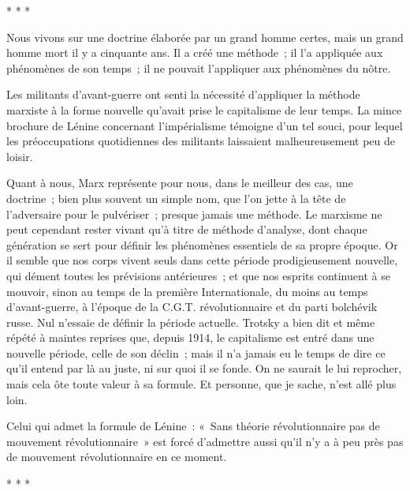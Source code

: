 \documentclass[french,twoside]{book} %
\begin{document}
\begin{center}
\noindent \centerline{* * *}\par
\end{center}

\noindent Nous vivons sur une doctrine élaborée par un grand homme certes, mais un grand homme mort il y a cinquante ans. Il a créé une méthode ; il l'a appliquée aux phénomènes de son temps ; il ne pouvait l'appliquer aux phénomènes du nôtre.\par
Les militants d'avant-guerre ont senti la nécessité d'appliquer la méthode marxiste à la forme nouvelle qu'avait prise le capitalisme de leur temps. La mince brochure de Lénine concernant l'impérialisme témoigne d'un tel souci, pour lequel les préoccupations quotidiennes des militants laissaient malheureusement peu de loisir.\par
Quant à nous, Marx représente pour nous, dans le meilleur des cas, une doctrine ; bien plus souvent un simple nom, que l'on jette à la tête de l'adversaire pour le pulvériser ; presque jamais une méthode. Le marxisme ne peut cependant rester vivant qu'à titre de méthode d'analyse, dont chaque génération se sert pour définir les phénomènes essentiels de sa propre époque. Or il semble que nos corps vivent seuls dans cette période prodigieusement nouvelle, qui dément toutes les prévisions antérieures ; et que nos esprits continuent à se mouvoir, sinon au temps de la première Internationale, du moins au temps d'avant-guerre, à l'époque de la C.G.T. révolutionnaire et du parti bolchévik russe. Nul n'essaie de définir la période actuelle. Trotsky a bien dit et même répété à maintes reprises que, depuis 1914, le capitalisme est entré dans une nouvelle période, celle de son déclin ; mais il n'a jamais eu le temps de dire ce qu'il entend par là au juste, ni sur quoi il se fonde. On ne saurait le lui reprocher, mais cela ôte toute valeur à sa formule. Et personne, que je sache, n'est allé plus loin.\par
Celui qui admet la formule de Lénine : « Sans théorie révolutionnaire pas de mouvement révolutionnaire » est forcé d'admettre aussi qu'il n'y a à peu près pas de mouvement révolutionnaire en ce moment.\par

\begin{center}
\noindent \centerline{* * *}\par
\end{center}
\end{document}
